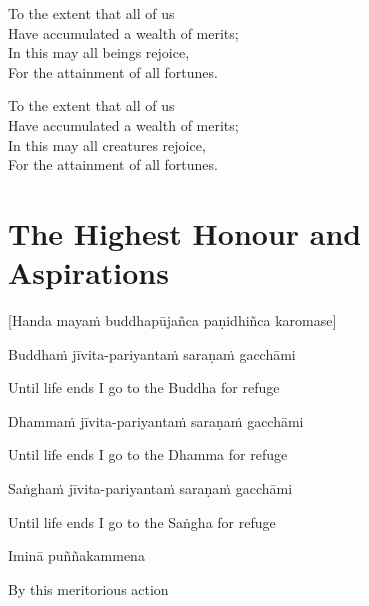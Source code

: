 \begin{cprenglish}
  To the extent that all of us\\
  Have accumulated a wealth of merits;\\
  In this may all beings rejoice,\\
  For the attainment of all fortunes.
\end{cprenglish}

\begin{cprenglish}
  To the extent that all of us\\
  Have accumulated a wealth of merits;\\
  In this may all creatures rejoice,\\
  For the attainment of all fortunes.
\end{cprenglish}


\clearpage

\section{The Highest Honour and Aspirations}
\label{highest-honour-aspirations}

\begin{center}
  [Handa mayaṁ buddhapūjañca paṇidhiñca karomase]
\end{center}

Buddhaṁ jīvita-pariyantaṁ saraṇaṁ gacchāmi

\begin{cprenglish}
  Until life ends I go to the Buddha for refuge
\end{cprenglish}

Dhammaṁ jīvita-pariyantaṁ saraṇaṁ gacchāmi

\begin{cprenglish}
  Until life ends I go to the Dhamma for refuge
\end{cprenglish}

Saṅghaṁ jīvita-pariyantaṁ saraṇaṁ gacchāmi

\begin{cprenglish}
  Until life ends I go to the Saṅgha for refuge
\end{cprenglish}

Iminā puññakammena

\begin{cprenglish}
  By this meritorious action
\end{cprenglish}

